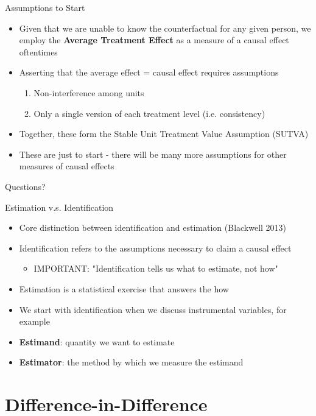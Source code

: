 \documentclass[]{beamer}
\begin{document}
\begin{frame}{Assumptions to Start}
	\begin{itemize}
		\item Given that we are unable to know the counterfactual for any given person, we employ the \textbf{Average Treatment Effect} as a measure of a causal effect oftentimes
		\item Asserting that the average effect = causal effect requires assumptions 
		\begin{enumerate}
			\item Non-interference among units 
			\item Only a single version of each treatment level (i.e. consistency)
		\end{enumerate}
		\item Together, these form the Stable Unit Treatment Value Assumption (SUTVA)
		\item These are just to start - there will be many more assumptions for other measures of causal effects
	\end{itemize}
\end{frame}

\begin{frame}
	Questions?
\end{frame}

\begin{frame}{Estimation v.s. Identification}
	\begin{itemize}
		\item Core distinction between identification and estimation (Blackwell 2013)
		\item Identification refers to the assumptions necessary to claim a causal effect
		\begin{itemize}
		\item IMPORTANT: "Identification tells us what to estimate, not how" 
		\end{itemize}
		\item Estimation is a statistical exercise that answers the how 
		\item We start with identification when we discuss instrumental variables, for example 
		\item \textbf{Estimand}: quantity we want to estimate
		\item \textbf{Estimator}: the method by which we measure the estimand 
	\end{itemize}
\end{frame}

\section{Difference-in-Difference}
\end{document}
